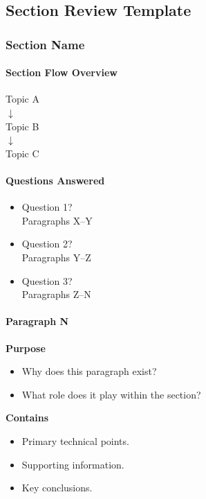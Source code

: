 \subsection{Section Review Template}

\subsubsection*{Section Name}

\paragraph{Section Flow Overview}

\begin{center}
Topic A\\
$\downarrow$\\
Topic B\\
$\downarrow$\\
Topic C
\end{center}

\paragraph{Questions Answered}

\begin{itemize}
\item Question 1? \\
Paragraphs X--Y

\item Question 2? \\
Paragraphs Y--Z

\item Question 3? \\
Paragraphs Z--N
\end{itemize}

\paragraph{Paragraph N}

\textbf{Purpose}
\begin{itemize}
\item Why does this paragraph exist?
\item What role does it play within the section?
\end{itemize}

\textbf{Contains}
\begin{itemize}
\item Primary technical points.
\item Supporting information.
\item Key conclusions.
\end{itemize}

